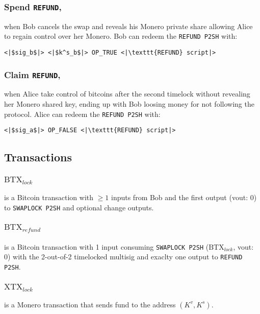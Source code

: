 \documentclass{llncs}
\begin{document}
\subsubsection{Spend \texttt{REFUND},}
when Bob cancels the swap and reveals his Monero private share allowing Alice to regain control over her Monero. Bob can redeem the \texttt{REFUND P2SH} with:

\begin{verbatim}
<|$sig_b$|> <|$k^s_b$|> OP_TRUE <|\texttt{REFUND} script|>
\end{verbatim}

\subsubsection{Claim \texttt{REFUND},}
when Alice take control of bitcoins after the second timelock without revealing her Monero shared key, ending up with Bob loosing money for not following the protocol. Alice can redeem the \texttt{REFUND P2SH} with:

\begin{verbatim}
<|$sig_a$|> OP_FALSE <|\texttt{REFUND} script|>
\end{verbatim}

\subsection{Transactions}
\subsubsection{$\text{BTX}_\textit{lock}$}
is a Bitcoin transaction with $\geq 1$ inputs from Bob and the first output (vout: 0) to \texttt{SWAPLOCK P2SH} and optional change outputs.

\subsubsection{$\text{BTX}_\textit{refund}$}
is a Bitcoin transaction with 1 input consuming \texttt{SWAPLOCK P2SH} ($\text{BTX}_\textit{lock}$, vout: 0) with the 2-out-of-2 timelocked multisig and exaclty one output to \texttt{REFUND P2SH}.

\subsubsection{$\text{XTX}_\textit{lock}$}
is a Monero transaction that sends fund to the address $(K^v,K^s)$.


%
%
\printbibliography
\end{document}
